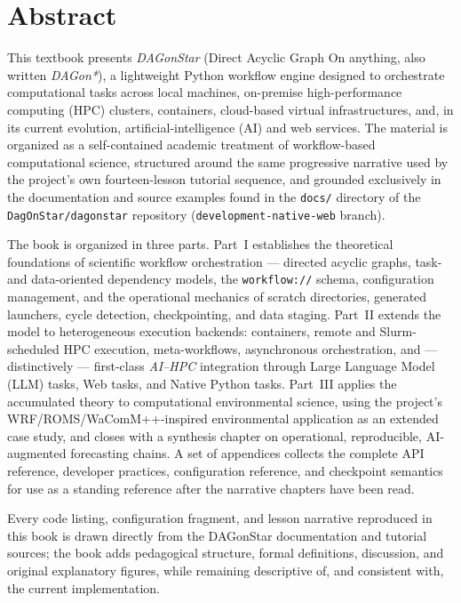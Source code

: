 \chapter*{Abstract}

This textbook presents \emph{DAGonStar} (Direct Acyclic Graph On anything, also
written \emph{DAGon*}), a lightweight Python workflow engine designed to
orchestrate computational tasks across local machines, on-premise
high-performance computing (HPC) clusters, containers, cloud-based virtual
infrastructures, and, in its current evolution, artificial-intelligence (AI)
and web services. The material is organized as a self-contained academic
treatment of workflow-based computational science, structured around the same
progressive narrative used by the project's own fourteen-lesson tutorial
sequence, and grounded exclusively in the documentation and source examples
found in the \texttt{docs/} directory of the
\texttt{DagOnStar/dagonstar} repository
(\texttt{development-native-web} branch).

The book is organized in three parts. Part~I establishes the theoretical
foundations of scientific workflow orchestration --- directed acyclic graphs,
task- and data-oriented dependency models, the \texttt{workflow://} schema,
configuration management, and the operational mechanics of scratch
directories, generated launchers, cycle detection, checkpointing, and data
staging. Part~II extends the model to heterogeneous execution backends:
containers, remote and Slurm-scheduled HPC execution, meta-workflows,
asynchronous orchestration, and --- distinctively --- first-class
\emph{AI--HPC} integration through Large Language Model (LLM) tasks, Web
tasks, and Native Python tasks. Part~III applies the accumulated theory to
computational environmental science, using the project's WRF/ROMS/WaComM++-inspired
environmental application as an extended case study, and closes with a
synthesis chapter on operational, reproducible, AI-augmented forecasting
chains. A set of appendices collects the complete API reference, developer
practices, configuration reference, and checkpoint semantics for use as a
standing reference after the narrative chapters have been read.

Every code listing, configuration fragment, and lesson narrative reproduced in
this book is drawn directly from the DAGonStar documentation and tutorial
sources; the book adds pedagogical structure, formal definitions, discussion,
and original explanatory figures, while remaining descriptive of, and
consistent with, the current implementation.
